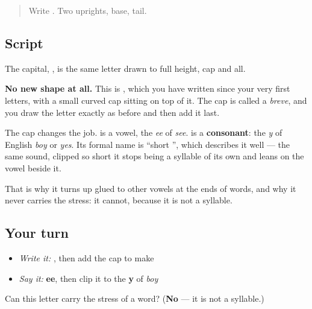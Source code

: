 \label{lesson:RU-W07-y-short}



\begin{quote}
Write . Two uprights, base, tail.
\end{quote}

\subsection*{Script}

\begin{quote}
   
\end{quote}

The capital, \textbf{}, is the same letter drawn to full height, cap and all.

\textbf{No new shape at all.} This is \textbf{}, which you have written since your very first letters, with a small curved cap sitting on top of it. The cap is called a \emph{breve}, and you draw the letter exactly as before and then add it last.

The cap changes the job. \textbf{} is a vowel, the \emph{ee} of \emph{see}. \textbf{} is a \textbf{consonant}: the \emph{y} of English \emph{boy} or \emph{yes}. Its formal name is \textquotedblleft{}short \textquotedblright{}, which describes it well — the same sound, clipped so short it stops being a syllable of its own and leans on the vowel beside it.

That is why it turns up glued to other vowels at the ends of words, and why it never carries the stress: it cannot, because it is not a syllable.

\subsection*{Your turn}
\begin{itemize}
\raggedright
  \item \emph{Write it:} , then add the cap to make 
  \item \emph{Say it:} \textbf{ee}, then clip it to the \textbf{y} of \emph{boy}
\end{itemize}

\begin{tcolorbox}[breakable,colback=teal!4,colframe=teal!35!black,title={Before you move on}]
Can this letter carry the stress of a word? (\textbf{No} — it is not a syllable.)
\end{tcolorbox}
